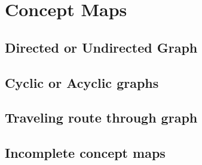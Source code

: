\chapter{Concept Maps}

\section{Directed or Undirected Graph}

\section{Cyclic or Acyclic graphs}

\section{Traveling route through graph}

\section{Incomplete concept maps}
